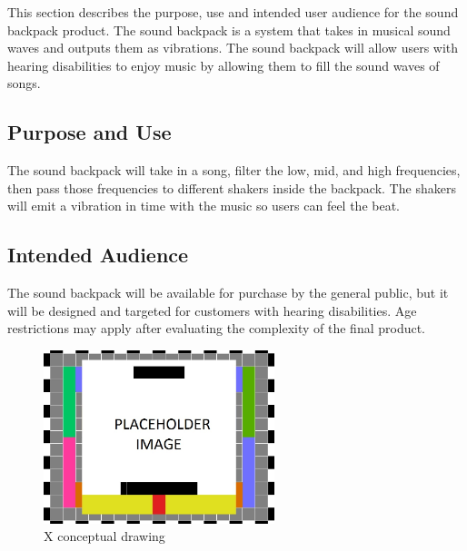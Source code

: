 This section describes the purpose, use and intended user audience for the sound backpack product. The sound backpack is a system that takes in musical sound waves and outputs them as vibrations. The sound backpack will allow users with hearing disabilities to enjoy music by allowing them to fill the sound waves of songs.

\subsection{Purpose and Use}
The sound backpack will take in a song, filter the low, mid, and high frequencies, then pass those frequencies to different shakers inside the backpack. The shakers will emit a vibration in time with the music so users can feel the beat.

\subsection{Intended Audience}
The sound backpack will be available for purchase by the general public, but it will be designed and targeted for customers with hearing disabilities. Age restrictions may apply after evaluating the complexity of the final product.

\begin{figure}[h!]
	\centering
   	\includegraphics[width=0.60\textwidth]{images/test_image}
    \caption{X conceptual drawing}
\end{figure}
